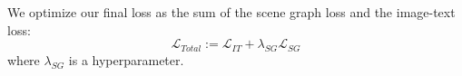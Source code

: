\documentclass[11pt]{article}
\begin{document}
We optimize our final loss as the sum of the scene graph loss and the image-text loss:
\begin{equation}
\label{eq:total_loss}
\mathcal{L}_{Total} := \mathcal{L}_{IT} + \lambda_{SG}\mathcal{L}_{SG}
\end{equation} 
where $\lambda_{SG}$ is a hyperparameter.
\end{document}

